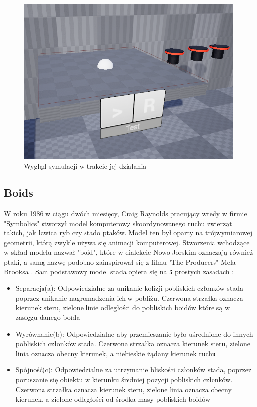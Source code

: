 \documentclass[a4paper,12pt,reqno]{article}
\begin{document}
\begin{figure}[H]%
\centering
\includegraphics[width=0.5\columnwidth]{graphics/agent/AgentInUE_1.png}
\caption{Wygląd symulacji w trakcie jej działania
\label{BPExample}}%
%
\qquad
\end{figure}  



\newpage
\subsection{Boids}

W roku 1986 w ciągu dwóch miesięcy, Craig Raynolds pracujący wtedy w firmie "Symbolics" stworzył model komputerowy skoordynowanego ruchu zwierząt takich, jak ławica ryb czy stado ptaków. Model ten był oparty na trójwymiarowej geometrii, którą zwykle używa się animacji komputerowej. Stworzenia wchodzące w skład modelu nazwał "boid", które w dialekcie Nowo Jorskim oznaczają również ptaki, a samą nazwę podobno zainspirował się z filmu "The Producers" Mela Brooksa \cite{boids_name}. Sam podstawowy model stada opiera się na 3 prostych zasadach \cite{flocking_system}:

\begin{itemize}
\item Separacja(a): Odpowiedzialne za unikanie kolizji pobliskich członków stada poprzez unikanie nagromadzenia ich w pobliżu. Czerwona strzałka oznacza kierunek steru, zielone linie odległości do pobliskich boidów które są w zasięgu danego boida
\item Wyrównanie(b): Odpowiedzialne aby przemieszanie było uśrednione do innych pobliskich członków stada. Czerwona strzałka oznacza kierunek steru, zielone linia oznacza obecny kierunek, a niebieskie żądany kierunek ruchu
\item Spójność(c): Odpowiedzialne za utrzymanie bliskości członków stada, poprzez poruszanie się obiektu w kierunku średniej pozycji pobliskich członków. Czerwona strzałka oznacza kierunek steru, zielone linia oznacza obecny kierunek, a zielone odległości od środka masy pobliskich boidów
\end{itemize}
\end{document}
